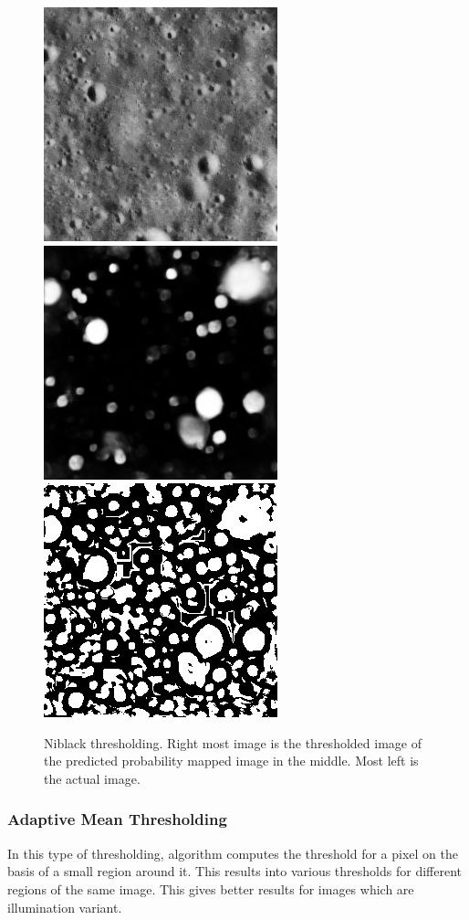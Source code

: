 \documentclass[11pt]{article}
\begin{document}
\begin{figure}[ht!]
	\includegraphics[width=.3\textwidth]{files/results/26.png}\hfill
	\includegraphics[width=.3\textwidth]{files/results/26_predict.png}\hfill
	\includegraphics[width=.3\textwidth]{files/results/niblack.png}
	\caption{Niblack thresholding. Right most image is the thresholded image of the predicted probability mapped image in the middle. Most left is the actual image.}
	\label{Niblack_th}
\end{figure}

\subsubsection{Adaptive Mean Thresholding}
In this type of thresholding, algorithm computes the threshold for a pixel on the basis of a small region around it. This results into various thresholds for different regions of the same image. This gives better results for images which are illumination variant.
\end{document}
